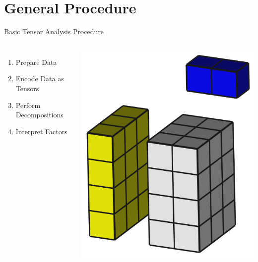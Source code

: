 \documentclass[handout]{beamer}
\begin{document}
\section{General Procedure}
\begin{frame}{Basic Tensor Analysis Procedure}
    \begin{columns}
    
    \begin{enumerate}
        \item Prepare Data
        \item Encode Data as Tensors
        \item Perform Decompositions
        \item Interpret Factors
    \end{enumerate}
    
    \includegraphics[max width=\textwidth, max height=0.7\textheight]{images/tensor}
    \end{columns}
\end{frame}
\end{document}
